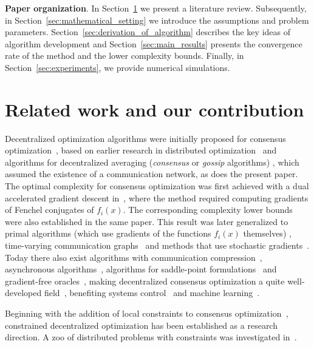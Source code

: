 \documentclass{article}
\newcommand{\eps}{\varepsilon}
\begin{document}
\noindent\textbf{Paper organization}. In Section~\ref{sec:related_work} we present a literature review. Subsequently, in Section~\ref{sec:mathematical_setting} we introduce the assumptions and problem parameters. Section~\ref{sec:derivation_of_algorithm} describes the key ideas of algorithm development and Section~\ref{sec:main_results} presents the convergence rate of the method and the lower complexity bounds. Finally, in Section~\ref{sec:experiments}, we provide numerical simulations.

\section{Related work and our contribution}\label{sec:related_work}
Decentralized optimization algorithms were initially proposed for consensus optimization~\cite{nedic2009distributed}, based on earlier research in distributed optimization~\cite{tsitsiklis1984problems, bertsekas1989parallel} and algorithms for decentralized averaging (\textit{consensus} or \textit{gossip} algorithms) \cite{boyd2006randomized, olshevsky2009convergence}, which assumed the existence of a communication network, as does the present paper.
The optimal complexity for consensus optimization was first achieved with a dual accelerated gradient descent in~\cite{scaman2017optimal}, where the method required computing gradients of Fenchel conjugates of $f_i(x)$. The corresponding complexity lower bounds were also established in the same paper. This result was later generalized to primal algorithms (which use gradients of the functions $f_i(x)$ themselves) \cite{kovalev2020optimal}, time-varying communication graphs~\cite{li2021accelerated,kovalev2021lower} and methods that use stochastic gradients~\cite{dvinskikh2019decentralized}.
Today there also exist algorithms with communication compression~\cite{beznosikov2023biased}, asynchronous algorithms~\cite{koloskova2024optimization}, algorithms for saddle-point formulations~\cite{rogozin2021decentralized} and gradient-free oracles~\cite{beznosikov2020derivative}, making decentralized consensus optimization a quite well-developed field~\cite{nedic2020distributed, gorbunov2022recent}, benefiting systems control~\cite{ram2009distributed} and machine learning~\cite{lian2017can}.

Beginning with the addition of local constraints to consensus optimization~\cite{nedic2010constrained, zhu2011distributed}, constrained decentralized optimization has been established as a research direction.
A zoo of distributed problems with constraints was investigated in~\cite{necoara2011parallel,necoara2014distributed, necoara2015linear}.
\end{document}
